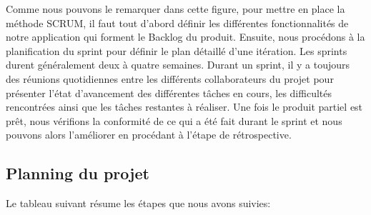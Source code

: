 Comme nous pouvons le remarquer dans cette figure, pour mettre en place la m\'{e}thode
SCRUM, il faut tout d'abord d\'{e}finir les diff\'{e}rentes fonctionnalit\'{e}s de notre application qui
forment le Backlog du produit. Ensuite, nous proc\'{e}dons \`{a} la planification du sprint pour d\'{e}finir
le plan d\'{e}taill\'{e} d'une it\'{e}ration. Les sprints durent g\'{e}n\'{e}ralement deux \`{a} quatre semaines. Durant
un sprint, il y a toujours des r\'{e}unions quotidiennes entre les diff\'{e}rents collaborateurs du projet
pour pr\'{e}senter l'\'{e}tat d'avancement des diff\'{e}rentes t\^{a}ches en cours, les difficult\'{e}s rencontr\'{e}es
ainsi que les t\^{a}ches restantes \`{a} r\'{e}aliser. Une fois le produit partiel est pr\^{e}t, nous v\'{e}rifions la
conformit\'{e} de ce qui a \'{e}t\'{e} fait durant le sprint et nous pouvons alors l'am\'{e}liorer en proc\'{e}dant \`{a}
l'\'{e}tape de r\'{e}trospective.


\subsection{Planning du projet}
Le tableau suivant résume les \'{e}tapes que nous avons suivies:


